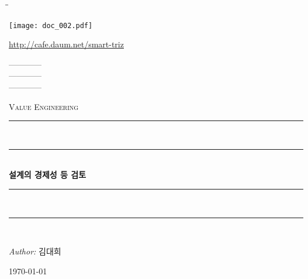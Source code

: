 \documentclass[12pt,a4paper]{book}
\begin{document}
		
		\begin{tabbing}
			\hspace{2cm}\= \hspace{2cm}\= \hspace{2cm}\kill
		\end{tabbing}


		\newpage
			

		\newpage
			


		\texttt{[image: doc\_002.pdf]}
		
		\url{http://cafe.daum.net/smart-triz}
		
		
		
		\newpage
		
				
		
		

		\hspace{2cm} ------------ \\
		\hspace*{4cm} ------------ \\
		\hspace*{6cm} ------------ \\




		\begin{titlepage}
		\singlespace
		\pagestyle{empty}
		\newcommand{\HRule}{\rule{\textwidth}{0.5mm}}
		\begin{center}
		\null
		\vspace{2cm}
		\textsc{\LARGE Value Engineering}\\[1.0cm]
		\HRule\\[-0.4cm]
		\HRule \\[0.4cm]
			{ \huge \bfseries 설계의 경제성 등 검토 \\[0.4cm] }
		\HRule\\[-0.4cm]
		\HRule \\[1.5cm]
		
		\noindent
		\begin{minipage}{1\textwidth}
			\begin{flushright} \large \emph{Author:}  김대희	\end{flushright}
		\end{minipage}%
		\vfill
		{\large \today}
		
		\end{center}
		\cleardoublepage
		\end{titlepage}																						
\end{document}
